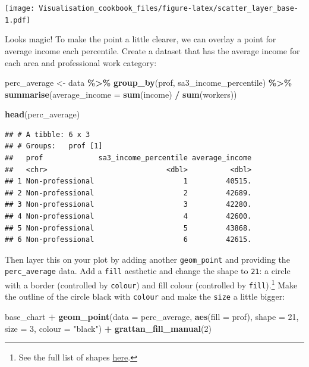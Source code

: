 \documentclass[
]{book}
\newenvironment{Shaded}{\begin{snugshade}}{\end{snugshade}}
\newcommand{\DataTypeTok}[1]{\textcolor[rgb]{0.13,0.29,0.53}{#1}}
\newcommand{\DecValTok}[1]{\textcolor[rgb]{0.00,0.00,0.81}{#1}}
\newcommand{\KeywordTok}[1]{\textcolor[rgb]{0.13,0.29,0.53}{\textbf{#1}}}
\newcommand{\NormalTok}[1]{#1}
\newcommand{\OperatorTok}[1]{\textcolor[rgb]{0.81,0.36,0.00}{\textbf{#1}}}
\newcommand{\StringTok}[1]{\textcolor[rgb]{0.31,0.60,0.02}{#1}}
\begin{document}
\texttt{[image: Visualisation\_cookbook\_files/figure-latex/scatter\_layer\_base-1.pdf]}

Looks magic! To make the point a little clearer, we can overlay a point for average income each percentile. Create a dataset that has the average income for each area and professional work category:

\begin{Shaded}
\begin{Highlighting}[]
\NormalTok{perc\_average \textless{}{-}}\StringTok{ }\NormalTok{data }\OperatorTok{\%\textgreater{}\%}\StringTok{ }
\StringTok{  }\KeywordTok{group\_by}\NormalTok{(prof, sa3\_income\_percentile) }\OperatorTok{\%\textgreater{}\%}\StringTok{ }
\StringTok{  }\KeywordTok{summarise}\NormalTok{(}\DataTypeTok{average\_income =} \KeywordTok{sum}\NormalTok{(income) }\OperatorTok{/}\StringTok{ }\KeywordTok{sum}\NormalTok{(workers))}

\KeywordTok{head}\NormalTok{(perc\_average)}
\end{Highlighting}
\end{Shaded}

\begin{verbatim}
## # A tibble: 6 x 3
## # Groups:   prof [1]
##   prof             sa3_income_percentile average_income
##   <chr>                            <dbl>          <dbl>
## 1 Non-professional                     1         40515.
## 2 Non-professional                     2         42689.
## 3 Non-professional                     3         42280.
## 4 Non-professional                     4         42600.
## 5 Non-professional                     5         43868.
## 6 Non-professional                     6         42615.
\end{verbatim}

Then layer this on your plot by adding another \texttt{geom\_point} and providing the \texttt{perc\_average} data. Add a \texttt{fill} aesthetic and change the shape to \texttt{21}: a circle with a border (controlled by \texttt{colour}) and fill colour (controlled by \texttt{fill}).\footnote{See the full list of shapes \href{https://ggplot2.tidyverse.org/reference/scale_shape.html}{here}.}
Make the outline of the circle black with \texttt{colour} and make the \texttt{size} a little bigger:

\begin{Shaded}
\begin{Highlighting}[]
\NormalTok{base\_chart }\OperatorTok{+}
\StringTok{  }\KeywordTok{geom\_point}\NormalTok{(}\DataTypeTok{data =}\NormalTok{ perc\_average,}
             \KeywordTok{aes}\NormalTok{(}\DataTypeTok{fill =}\NormalTok{ prof),}
             \DataTypeTok{shape =} \DecValTok{21}\NormalTok{,}
             \DataTypeTok{size =} \DecValTok{3}\NormalTok{, }
             \DataTypeTok{colour =} \StringTok{"black"}\NormalTok{) }\OperatorTok{+}\StringTok{ }
\StringTok{  }\KeywordTok{grattan\_fill\_manual}\NormalTok{(}\DecValTok{2}\NormalTok{)}
\end{Highlighting}
\end{Shaded}
\end{document}
